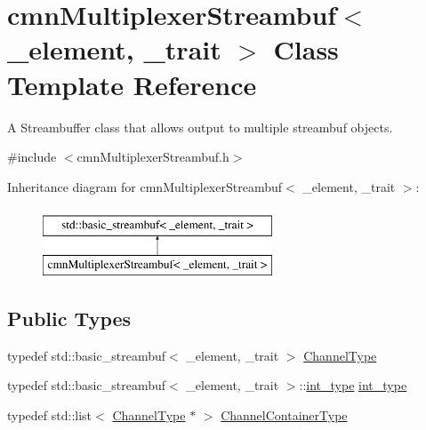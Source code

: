 \hypertarget{classcmn_multiplexer_streambuf}{}\section{cmn\+Multiplexer\+Streambuf$<$ \+\_\+element, \+\_\+trait $>$ Class Template Reference}
\label{classcmn_multiplexer_streambuf}


A Streambuffer class that allows output to multiple streambuf objects.  




{\ttfamily \#include $<$cmn\+Multiplexer\+Streambuf.\+h$>$}

Inheritance diagram for cmn\+Multiplexer\+Streambuf$<$ \+\_\+element, \+\_\+trait $>$\+:\begin{figure}[H]
\begin{center}
\leavevmode
\includegraphics[height=2.000000cm]{d0/d78/classcmn_multiplexer_streambuf}
\end{center}
\end{figure}
\subsection*{Public Types}
\begin{DoxyCompactItemize}
\item 
typedef std\+::basic\+\_\+streambuf$<$ \+\_\+element, \+\_\+trait $>$ \hyperlink{classcmn_multiplexer_streambuf_a7eb353f0b5fed1a2c8707712aac82095}{Channel\+Type}
\item 
typedef std\+::basic\+\_\+streambuf$<$ \+\_\+element, \+\_\+trait $>$\+::\hyperlink{classcmn_multiplexer_streambuf_aaa63d7e4ef3d7ef78dee540971ec88e9}{int\+\_\+type} \hyperlink{classcmn_multiplexer_streambuf_aaa63d7e4ef3d7ef78dee540971ec88e9}{int\+\_\+type}
\item 
typedef std\+::list$<$ \hyperlink{classcmn_multiplexer_streambuf_a7eb353f0b5fed1a2c8707712aac82095}{Channel\+Type} $\ast$ $>$ \hyperlink{classcmn_multiplexer_streambuf_a3b414c7f89b55584aef7c8b655bc03ea}{Channel\+Container\+Type}
\end{DoxyCompactItemize}
